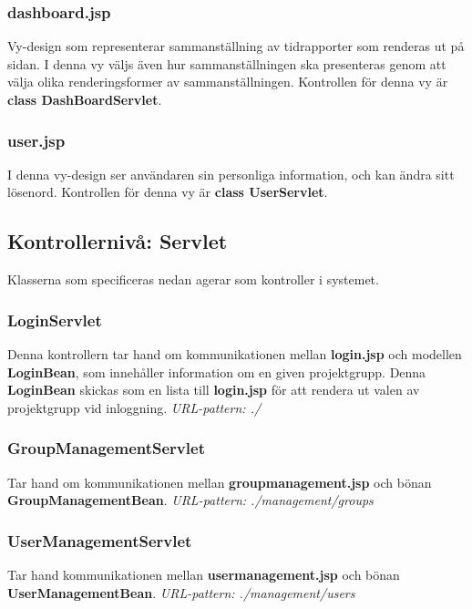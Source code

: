 \documentclass[paper=a4, fontsize=11pt,twoside]{article}
\begin{document}
\subsubsection{dashboard.jsp}	
Vy-design som representerar sammanställning av tidrapporter som renderas ut på sidan. I denna vy väljs även hur sammanställningen ska presenteras genom att välja olika renderingsformer av sammanställningen. Kontrollen för denna vy är \textbf{class DashBoardServlet}.

\subsubsection{user.jsp}	
I denna vy-design ser användaren sin personliga information, och kan ändra sitt lösenord. Kontrollen för denna vy är \textbf{ class UserServlet}.

\subsection{Kontrollernivå: Servlet}
Klasserna som specificeras nedan agerar som kontroller i systemet.

\subsubsection{LoginServlet}
Denna kontrollern tar hand om kommunikationen mellan \textbf{login.jsp} och modellen \textbf{LoginBean}, som innehåller information om en given projektgrupp. Denna \textbf{LoginBean} skickas som en lista till \textbf{login.jsp} för att rendera ut valen av projektgrupp vid inloggning.\newline
\newline
\textit{URL-pattern: ./}

\subsubsection{GroupManagementServlet}
Tar hand om kommunikationen mellan \textbf{groupmanagement.jsp} och bönan \textbf{GroupManagementBean}.\newline
\newline
\textit{URL-pattern: ./management/groups}

\subsubsection{UserManagementServlet}
Tar hand kommunikationen mellan \textbf{usermanagement.jsp} och bönan \textbf{UserManagementBean}.\newline
\newline
\textit{URL-pattern: ./management/users}
\end{document}
